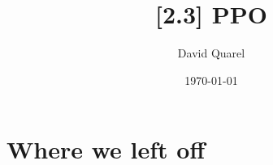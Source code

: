 \providecommand{\HANDOUT}{1}


\newcommand{\R}{\mathcal{R}}
\renewcommand{\S}{\mathcal{S}}
\newcommand{\A}{\mathcal{A}}
\renewcommand{\Pr}{\text{Pr}}
\renewcommand{\P}{\text{P}}
\newcommand{\iver}[1]{\llbracket {#1} \rrbracket}
\newcommand{\pth}{{\boldsymbol{\phi}}}
\newcommand{\eps}{\epsilon}
\newcommand{\eplen}{T}
\newcommand{\old}{\text{old}}
\newcommand{\Vold}{V_{\pth_\old}}



\title[{[2.3] PPO}]
{{[2.3] PPO}}

\author[David Quarel]
{David Quarel}


\date[\today]
{\today}

\frame{\titlepage}

\section{Where we left off}

